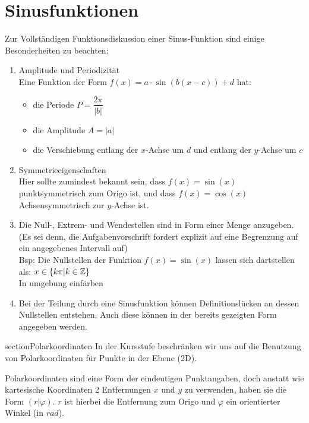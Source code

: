 \section{Sinusfunktionen}
Zur Vollständigen Funktionsdiskussion einer Sinus-Funktion sind einige Besonderheiten zu beachten:
\begin{enumerate}
\item Amplitude und Periodizität\\
Eine Funktion der Form $f(x)=a\cdot\sin(b(x-c))+d$ hat:\begin{itemize}
\item die Periode $P = \dfrac{2\pi}{|b|}$
\item die Amplitude $A = |a|$
\item die Verschiebung entlang der $x$-Achse um $d$ und entlang der $y$-Achse um $c$
\end{itemize}
\item Symmetrieeigenschaften\\
Hier sollte zumindest bekannt sein, dass $f(x)=\sin(x)$ punktsymmetrisch zum Origo ist, und dass $f(x)=\cos(x)$ Achsensymmetrisch zur $y$-Achse ist.
\item Die Null-, Extrem- und Wendestellen sind in Form einer Menge anzugeben. (Es sei denn, die Aufgabenvorschrift fordert explizit auf eine Begrenzung auf ein angegebenes Intervall auf)\\
Bsp: Die Nullstellen der Funktion $f(x)=\sin(x)$ lassen sich dartstellen als: $x \in \{k\pi|k \in \mathbb{Z}\}$
\\ In umgebung einfärben
\item Bei der Teilung durch eine Sinusfunktion können Definitionslücken an dessen Nullstellen entstehen. Auch diese können in der bereits gezeigten Form angegeben werden.
\end{enumerate}section{Polarkoordinaten}
In der Kursstufe beschränken wir uns auf die Benutzung von Polarkoordinaten für Punkte in der Ebene (2D).
\begin{Beweis}
Polarkoordinaten sind eine Form der eindeutigen Punktangaben, doch anstatt wie kartesische Koordinaten 2 Entfernungen $x$ und $y$ zu verwenden, haben sie die Form $(r|\varphi)$. $r$ ist hierbei die Entfernung zum Origo und $\varphi$ ein orientierter Winkel (in $rad$).
\end{Beweis}
